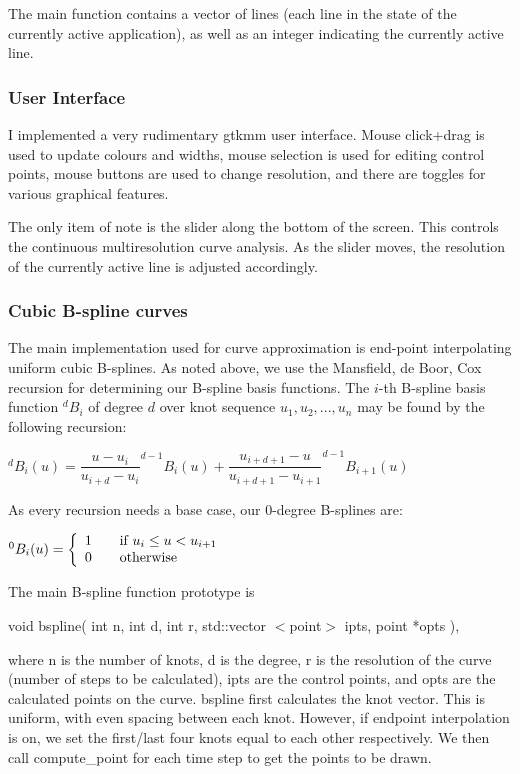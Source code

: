 \documentclass[11pt]{article}
\begin{document}
The main function contains a vector of lines (each line in the state of the currently active application), as well as an integer indicating the currently active line.

\subsubsection{User Interface}
\label{sec:UI}
I implemented a very rudimentary gtkmm user interface. Mouse click+drag is used to update colours and widths, mouse selection is used for editing control points, mouse buttons are used to change resolution, and there are toggles for various graphical features.

The only item of note is the slider along the bottom of the screen. This controls the continuous multiresolution curve analysis. As the slider moves, the resolution of the currently active line is adjusted accordingly.

\subsubsection{Cubic B-spline curves}
\label{sec:cbcs}
The main implementation used for curve approximation is end-point interpolating uniform cubic B-splines. As noted above, we use the Mansfield, de Boor, Cox recursion for determining our B-spline basis functions. The $i$-th B-spline basis function $^{d}B_{i}$ of degree $d$ over knot sequence $u_{1}, u_{2}, ..., u_{n}$ may be found by the following recursion:
\begin{center}
$^{d}B_{i}(u) = \dfrac{u - u_{i}}{u_{i+d} - u_{i}} ^{d-1}B_{i}(u) + \dfrac{u_{i + d + 1} - u}{u_{i + d + 1} - u_{i + 1}} ^{d-1}B_{i+1}(u)$
\end{center}
As every recursion needs a base case, our $0$-degree  B-splines are:
\begin{center}
$^{0}B_{i}(u) =
\left\{
\begin{array}{l l}
1 & \quad \text{if $u_{i} \leq u < u_{i+1}$}\\
0 & \quad \text{otherwise}\\
\end{array}
\right.$
\end{center}

The main B-spline function prototype is
\begin{center}
void bspline( int n, int d, int r, std::vector $<$point$>$ ipts, point *opts ),
\end{center}
where n is the number of knots, d is the degree, r is the resolution of the curve (number of steps to be calculated), ipts are the control points, and opts are the calculated points on the curve. bspline first calculates the knot vector. This is uniform, with even spacing between each knot. However, if endpoint interpolation is on, we set the first/last four knots equal to each other respectively. We then call compute\_point for each time step to get the points to be drawn.
\end{document}
